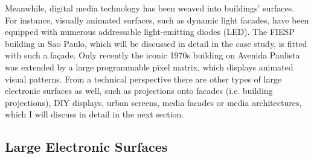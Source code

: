 
Meanwhile, digital media technology has been weaved into buildings’ surfaces. 
For instance, visually animated surfaces, such as dynamic light facades, have been equipped with numerous addressable light-emitting diodes (LED). The FIESP building in Sao Paulo, which will be discussed in detail in the case study, is fitted with such a façade. 
Only recently the iconic 1970s building on Avenida Paulista was extended by a large programmable pixel matrix, which displays animated visual patterns. 
From a technical perspective there are other types of large electronic surfaces as well, such as projections onto facades (i.e. building projections), DIY displays, urban screens, media facades or media architectures, which I will discuss in detail in the next section.





\subsection{Large Electronic Surfaces}

